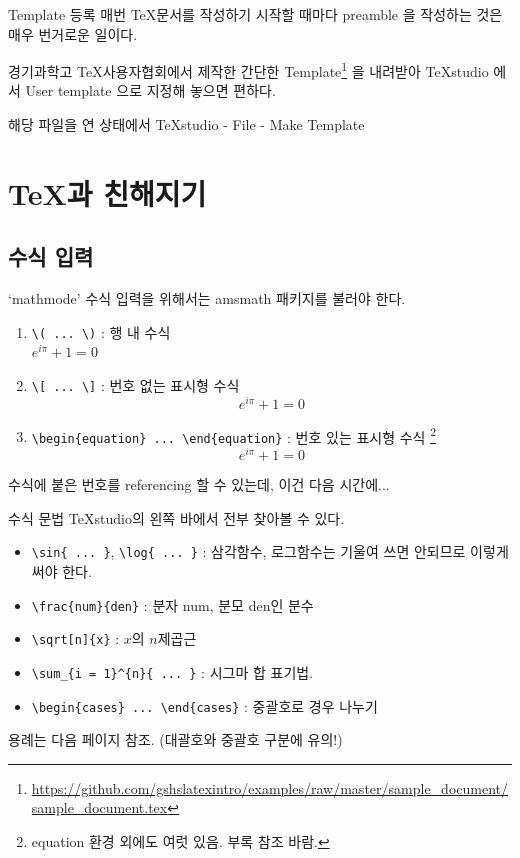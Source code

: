 \documentclass[12pt]{beamer}
\begin{document}
\begin{frame}{Template 등록}
	매번 \TeX 문서를 작성하기 시작할 때마다 preamble 을 작성하는 것은 매우 번거로운 일이다. 
	
	경기과학고 \TeX 사용자협회에서 제작한 간단한 Template\footnote{\url{https://github.com/gshslatexintro/examples/raw/master/sample_document/sample_document.tex}} 을 내려받아 TeXstudio 에서 User template 으로 지정해 놓으면 편하다.
	\vspace{0.7cm}
	
	해당 파일을 연 상태에서 TeXstudio - File - Make Template
\end{frame}
\section{\TeX 과 친해지기}
\subsection{수식 입력}
\begin{frame}[fragile]{`mathmode'}
	수식 입력을 위해서는 amsmath 패키지를 불러야 한다.
	\begin{enumerate}
		\item \verb|\( ... \)| : 행 내 수식 \\
		\( e^{i\pi}+1=0 \)
		\item \verb|\[ ... \]| : 번호 없는 표시형 수식
		\[ e^{i\pi}+1=0 \]
		\item \verb|\begin{equation} ... \end{equation}|
		: 번호 있는 표시형 수식
		\footnote{equation 환경 외에도 여럿 있음. 부록 참조 바람.}
		\begin{equation}
			e^{i\pi}+1=0
		\end{equation}
	\end{enumerate}
	수식에 붙은 번호를 referencing 할 수 있는데, 이건 다음 시간에...
\end{frame}
\begin{frame}[fragile]{수식 문법}
	TeXstudio의 왼쪽 바에서 전부 찾아볼 수 있다.
	\begin{itemize}
		\item \verb|\sin{ ... }|, \verb|\log{ ... }|
		: 삼각함수, 로그함수는 기울여 쓰면 안되므로 이렇게 써야 한다.
		\item \verb|\frac{num}{den}|
		: 분자 num, 분모 den인 분수
		\item \verb|\sqrt[n]{x}|
		: $x$의 $n$제곱근
		\item \verb|\sum_{i = 1}^{n}{ ... }|
		: 시그마 합 표기법.
		\item \verb|\begin{cases} ... \end{cases}|
		: 중괄호로 경우 나누기
	\end{itemize}
	용례는 다음 페이지 참조. {\footnotesize (대괄호와 중괄호 구분에 유의!)}
\end{frame}
\end{document}
